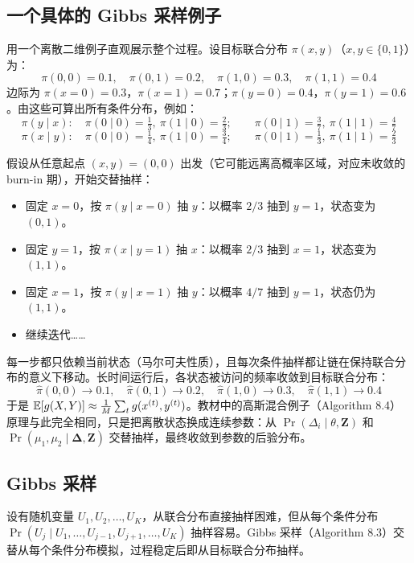 \subsection{一个具体的 Gibbs 采样例子}

用一个离散二维例子直观展示整个过程。设目标联合分布 $\pi(x, y)$（$x, y \in \{0,1\}$）为：
\[
    \pi(0,0) = 0.1,\quad \pi(0,1) = 0.2,\quad \pi(1,0) = 0.3,\quad \pi(1,1) = 0.4
\]
边际为 $\pi(x{=}0) = 0.3$，$\pi(x{=}1) = 0.7$；$\pi(y{=}0) = 0.4$，$\pi(y{=}1) = 0.6$。由这些可算出所有条件分布，例如：
\[
    \pi(y \mid x):\quad \pi(0\mid 0) = \tfrac{1}{3},\ \pi(1\mid 0) = \tfrac{2}{3};\qquad
    \pi(0\mid 1) = \tfrac{3}{7},\ \pi(1\mid 1) = \tfrac{4}{7}
\]
\[
    \pi(x \mid y):\quad \pi(0\mid 0) = \tfrac{1}{4},\ \pi(1\mid 0) = \tfrac{3}{4};\qquad
    \pi(0\mid 1) = \tfrac{1}{3},\ \pi(1\mid 1) = \tfrac{2}{3}
\]

假设从任意起点 $(x, y) = (0, 0)$ 出发（它可能远离高概率区域，对应未收敛的 burn-in 期），开始交替抽样：

\begin{itemize}
    \item 固定 $x = 0$，按 $\pi(y \mid x = 0)$ 抽 $y$：以概率 $2/3$ 抽到 $y = 1$，状态变为 $(0, 1)$。
    \item 固定 $y = 1$，按 $\pi(x \mid y = 1)$ 抽 $x$：以概率 $2/3$ 抽到 $x = 1$，状态变为 $(1, 1)$。
    \item 固定 $x = 1$，按 $\pi(y \mid x = 1)$ 抽 $y$：以概率 $4/7$ 抽到 $y = 1$，状态仍为 $(1, 1)$。
    \item 继续迭代……
\end{itemize}

每一步都只依赖当前状态（马尔可夫性质），且每次条件抽样都让链在保持联合分布的意义下移动。长时间运行后，各状态被访问的频率收敛到目标联合分布：
\[
    \hat{\pi}(0,0) \to 0.1,\quad \hat{\pi}(0,1) \to 0.2,\quad \hat{\pi}(1,0) \to 0.3,\quad \hat{\pi}(1,1) \to 0.4
\]
于是 $\mathbb{E}[g(X,Y)] \approx \frac{1}{M}\sum_t g(x^{(t)}, y^{(t)})$。教材中的高斯混合例子（Algorithm 8.4）原理与此完全相同，只是把离散状态换成连续参数：从 $\Pr(\Delta_i \mid \theta, \mathbf{Z})$ 和 $\Pr(\mu_1, \mu_2 \mid \bm{\Delta}, \mathbf{Z})$ 交替抽样，最终收敛到参数的后验分布。

\subsection{Gibbs 采样}

设有随机变量 $U_1, U_2, \ldots, U_K$，从联合分布直接抽样困难，但从每个条件分布 $\Pr(U_j \mid U_1, \ldots, U_{j-1}, U_{j+1}, \ldots, U_K)$ 抽样容易。Gibbs 采样（Algorithm 8.3）交替从每个条件分布模拟，过程稳定后即从目标联合分布抽样。

